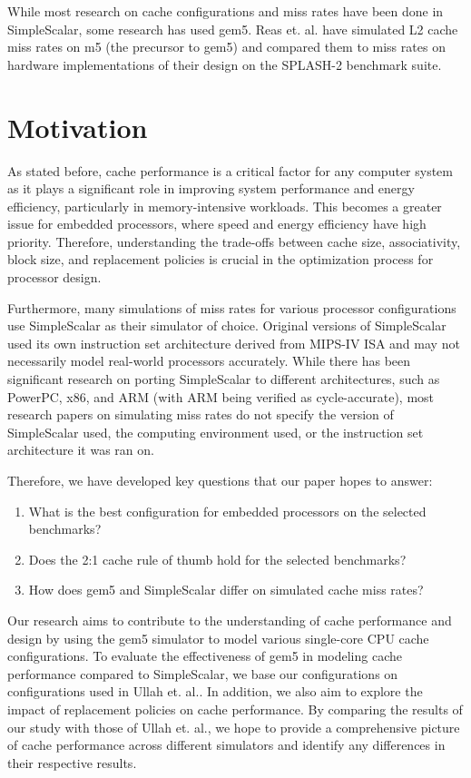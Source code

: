 \documentclass[conference]{IEEEtran}
\begin{document}
While most research on cache configurations and miss rates have been done in SimpleScalar, some research has used gem5. Reas et. al.\cite{10.1109/UKSIM.2010.35} have simulated L2 cache miss rates on m5 (the precursor to gem5) and compared them to miss rates on hardware implementations of their design on the SPLASH-2 benchmark suite.

\section{Motivation}

As stated before, cache performance is a critical factor for any computer system as it plays a significant role in improving system performance and energy efficiency, particularly in memory-intensive workloads. This becomes a greater issue for embedded processors, where speed and energy efficiency have high priority. Therefore, understanding the trade-offs between cache size, associativity, block size, and replacement policies is crucial in the optimization process for processor design.

Furthermore, many simulations of miss rates for various processor configurations use SimpleScalar\cite{10.1145/268806.268810} as their simulator of choice. Original versions of SimpleScalar used its own instruction set architecture derived from MIPS-IV ISA\cite{10.1145/268806.268810} and may not necessarily model real-world processors accurately. While there has been significant research on porting SimpleScalar to different architectures, such as PowerPC, x86, and ARM\cite{10.1145/986537.986601} (with ARM being verified as cycle-accurate\cite{CHUNG2006137}), most research papers on simulating miss rates do not specify the version of SimpleScalar used, the computing environment used, or the instruction set architecture it was ran on.

Therefore, we have developed key questions that our paper hopes to answer:

\begin{enumerate}
  \item What is the best configuration for embedded processors on the selected benchmarks?
  \item Does the 2:1 cache rule of thumb hold for the selected benchmarks?
  \item How does gem5 and SimpleScalar differ on simulated cache miss rates?
\end{enumerate}

Our research aims to contribute to the understanding of cache performance and design by using the gem5 simulator to model various single-core CPU cache configurations. To evaluate the effectiveness of gem5 in modeling cache performance compared to SimpleScalar, we base our configurations on configurations used in Ullah et. al.. In addition, we also aim to explore the impact of replacement policies on cache performance. By comparing the results of our study with those of Ullah et. al., we hope to provide a comprehensive picture of cache performance across different simulators and identify any differences in their respective results.
\end{document}
